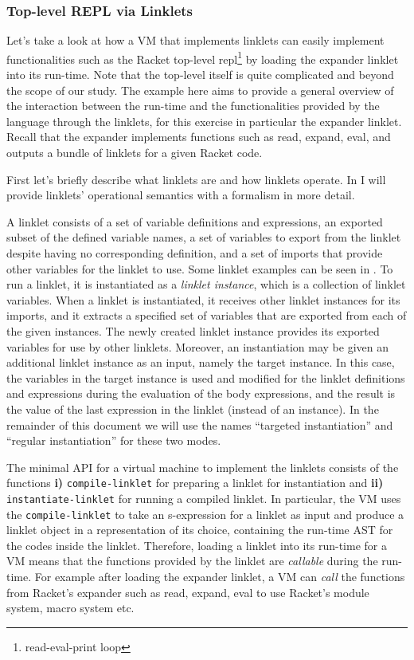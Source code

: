 \subsubsection{Top-level REPL via Linklets}
\label{subsec:toplevel-example}

Let's take a look at how a VM that implements linklets can easily
implement functionalities such as the Racket top-level
repl\footnote{read-eval-print loop} by loading the expander linklet
into its run-time. Note that the top-level itself is quite complicated
and beyond the scope of our study. The example here aims to provide a
general overview of the interaction between the run-time and the
functionalities provided by the language through the linklets, for
this exercise in particular the expander linklet. Recall that the
expander implements functions such as read, expand, eval, and outputs
a bundle of linklets for a given Racket code.

First let's briefly describe what linklets are and how linklets
operate. In  I will provide linklets'
operational semantics with a formalism in more detail.

A linklet consists of a set of variable definitions and expressions,
an exported subset of the defined variable names, a set of variables
to export from the linklet despite having no corresponding definition,
and a set of imports that provide other variables for the linklet to
use. Some linklet examples can be seen in
. To run a linklet, it is
instantiated as a \emph{linklet instance}, which is a collection of
linklet variables. When a linklet is instantiated, it receives other
linklet instances for its imports, and it extracts a specified set of
variables that are exported from each of the given instances. The
newly created linklet instance provides its exported variables for use
by other linklets. Moreover, an instantiation may be given an
additional linklet instance as an input, namely the target
instance. In this case, the variables in the target instance is used
and modified for the linklet definitions and expressions during the
evaluation of the body expressions, and the result is the value of the
last expression in the linklet (instead of an instance). In the
remainder of this document we will use the names ``targeted
instantiation'' and ``regular instantiation'' for these two modes.

The minimal API for a virtual machine to implement the linklets
consists of the functions \textbf{i)} \verb|compile-linklet| for
preparing a linklet for instantiation and \textbf{ii)}
\verb|instantiate-linklet| for running a compiled linklet. In
particular, the VM uses the \verb|compile-linklet| to take an
s-expression for a linklet as input and produce a linklet object in a
representation of its choice, containing the run-time AST for the
codes inside the linklet. Therefore, loading a linklet into its
run-time for a VM means that the functions provided by the linklet are
\emph{callable} during the run-time. For example after loading the
expander linklet, a VM can \emph{call} the functions from Racket's
expander such as read, expand, eval to use Racket's module system,
macro system etc.

